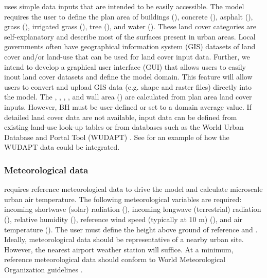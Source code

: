 \documentclass[final,3p,times,authoryear]{elsarticle}
\begin{document}
 uses simple data inputs that are intended to be easily accessible.  The model requires the user to define the plan area of buildings (), concrete (), asphalt (), grass (), irrigated grass (), tree (), and water (). These land cover categories are self-explanatory and describe most of the surfaces present in urban areas. Local governments often have geographical information system (GIS) datasets of land cover and/or land-use that can be used for land cover input data. Further, we intend to develop a graphical user interface (GUI) that allows users to easily inout land cover datasets and define the model domain. This  feature will allow users to convert and upload GIS data (e.g. shape and raster files) directly into the model. The , , , , and wall area () are calculated from plan area land cover inputs. However, \glsdesc{BH} must be user defined or set to a domain average value. If detailed land cover data are not available, input data can be defined from existing land-use look-up tables or from databases such as the World Urban Database and Portal Tool (WUDAPT) \citep{mills2015,Ching2018}. See \cite{wouters2016efficient} for an example of how the WUDAPT data could be integrated. 




\subsubsection{Meteorological data}\label{sec:metdata}

 requires reference meteorological data to drive the model and calculate microscale urban air temperature. The following meteorological variables are required: incoming shortwave (solar) radiation (), incoming longwave (terrestrial) radiation (), relative humidity (), reference wind speed (typically at 10 m) (), and air temperature (). The user must define the height above ground of reference  and . Ideally, meteorological data should be representative of a nearby urban site. However, the nearest airport weather station will suffice. %
At a minimum, reference meteorological data should conform to World Meteorological Organization guidelines \citep{oke2007siting}.
\end{document}
